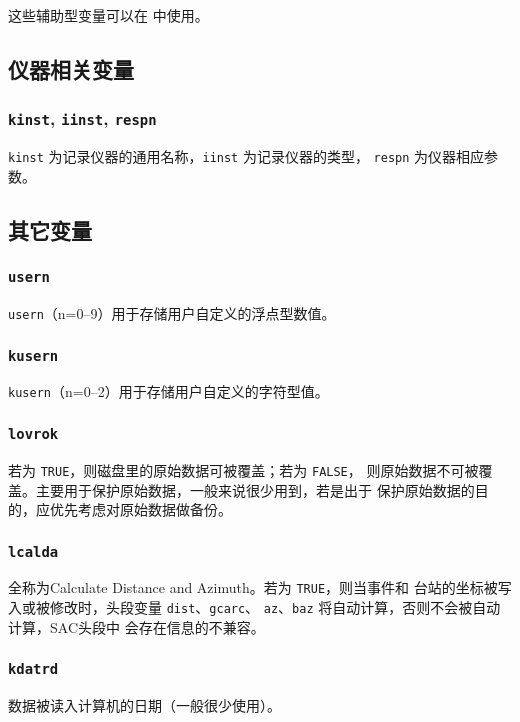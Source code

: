 这些辅助型变量可以在  中使用。

\subsection{仪器相关变量}
\subsubsection{\texttt{kinst}, \texttt{iinst}\dag, \texttt{respn}\dag}
\texttt{kinst} 为记录仪器的通用名称，\texttt{iinst} 为记录仪器的类型，
\texttt{respn} 为仪器相应参数。

\subsection{其它变量}
\subsubsection{\texttt{usern}}
\texttt{usern}（n=0--9）用于存储用户自定义的浮点型数值。

\subsubsection{\texttt{kusern}}
\texttt{kusern}（n=0--2）用于存储用户自定义的字符型值。

\subsubsection{\texttt{lovrok}}
若为 \texttt{TRUE}，则磁盘里的原始数据可被覆盖；若为 \texttt{FALSE}，
则原始数据不可被覆盖。主要用于保护原始数据，一般来说很少用到，若是出于
保护原始数据的目的，应优先考虑对原始数据做备份。

\subsubsection{\texttt{lcalda}}
全称为Calculate Distance and Azimuth。若为 \texttt{TRUE}，则当事件和
台站的坐标被写入或被修改时，头段变量 \texttt{dist}、\texttt{gcarc}、
\texttt{az}、\texttt{baz} 将自动计算，否则不会被自动计算，SAC头段中
会存在信息的不兼容。

\subsubsection{\texttt{kdatrd}}
数据被读入计算机的日期（一般很少使用）。
